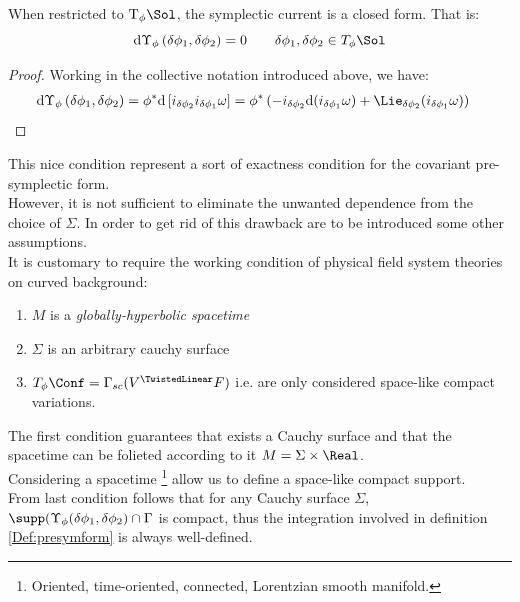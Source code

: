 \documentclass[a4paper,12pt]{scrartcl}  %
\begin{document}
\begin{proposition}\label{Prop:CurrentClosed}
	When restricted to $\textrm{T}_\phi \Sol$, the symplectic current is a closed form. That is:
	\begin{displaymath}
		\textrm{d} \Upsilon_\phi \left( \delta \phi_1 , \delta \phi_2 \right) = 0 \qquad \delta \phi_1 , \delta \phi_2 \in T_\phi \Sol
	\end{displaymath}
\end{proposition}
\begin{proof}
	Working in the collective notation introduced above, we have:
	\begin{align*}
		\textrm{d} \Upsilon_\phi \left( \delta \phi_1 , \delta \phi_2 \right) &= 
		\phi^\ast \textrm{d} \left[ i_{\delta\phi_2} i_{\delta \phi_1} \omega \right] = 
		\phi^\ast \left( - i_{\delta\phi_2} \textrm{d} ( i_{\delta \phi_1} \omega )  + \Lie_{\delta\phi_2 } ( i_{\delta \phi_1} \omega ) \right)
	\end{align*}
	
\end{proof}

This nice condition represent a sort of exactness condition for the covariant pre-symplectic form.\\
However, it is not sufficient to eliminate the unwanted dependence from the choice of $\Sigma$.
In order to get rid of this drawback are to be introduced some other assumptions.\\
It is customary to require the working condition of physical field system theories on curved background:
\begin{enumerate}
	\item $M$ is a \emph{globally-hyperbolic spacetime}
	\item $\Sigma$ is an arbitrary cauchy surface
	\item $T_\phi \Conf =\Gamma_{sc} (V^\TwistedLinear F )$ i.e. are only considered space-like compact variations.
\end{enumerate}
The first condition guarantees that exists a Cauchy surface and that the spacetime can be folieted according to it $M= \Sigma \times \Real$.\\
Considering a spacetime \footnote{Oriented, time-oriented, connected, Lorentzian smooth manifold. } allow us to define a space-like compact support.\\
From last condition follows that for any Cauchy surface $\Sigma$, $ \supp(\Upsilon_\phi (\delta \phi_1, \delta \phi_2) \cap \Gamma$ is compact, thus the integration involved in definition \ref{Def:presymform} is always well-defined.
\end{document}

